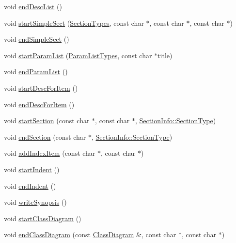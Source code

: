 \begin{DoxyCompactItemize}
\item 
void \hyperlink{class_latex_generator_afa2168d8b4b6bb3ec79398128e5a36f6}{end\+Desc\+List} ()
\item 
void \hyperlink{class_latex_generator_a854408e8d2e2dae3a8623303efff9be2}{start\+Simple\+Sect} (\hyperlink{class_base_output_doc_interface_a07a3d5df76a714674e070e5e236fe886}{Section\+Types}, const char $\ast$, const char $\ast$, const char $\ast$)
\item 
void \hyperlink{class_latex_generator_a77de974324f4e432fdc7511a35420a01}{end\+Simple\+Sect} ()
\item 
void \hyperlink{class_latex_generator_a2ee56b14fecf40c894b24bab806fb6b1}{start\+Param\+List} (\hyperlink{class_base_output_doc_interface_a944ed4d9fb389999c2724eeb321b8c8c}{Param\+List\+Types}, const char $\ast$title)
\item 
void \hyperlink{class_latex_generator_ac4add448cd45bd24b9055e59ca16c0e1}{end\+Param\+List} ()
\item 
void \hyperlink{class_latex_generator_a423a4c8f0d6b49352edcfa7261fdb1c0}{start\+Desc\+For\+Item} ()
\item 
void \hyperlink{class_latex_generator_a435efc951be4e6d166b4658a34d8b810}{end\+Desc\+For\+Item} ()
\item 
void \hyperlink{class_latex_generator_a93e679ac80ca24f50f72fefa51e7d98e}{start\+Section} (const char $\ast$, const char $\ast$, \hyperlink{struct_section_info_a32308f52dd59422b14fb75a92c90ebf1}{Section\+Info\+::\+Section\+Type})
\item 
void \hyperlink{class_latex_generator_aec87e4e5a2e5f72924316fb20005903b}{end\+Section} (const char $\ast$, \hyperlink{struct_section_info_a32308f52dd59422b14fb75a92c90ebf1}{Section\+Info\+::\+Section\+Type})
\item 
void \hyperlink{class_latex_generator_aabbdce121f41f32494aa03a28863840d}{add\+Index\+Item} (const char $\ast$, const char $\ast$)
\item 
void \hyperlink{class_latex_generator_a74eea0dc8113265d289a01f7f59fcf39}{start\+Indent} ()
\item 
void \hyperlink{class_latex_generator_a424ac60d3215a138bd4e50227c0e4445}{end\+Indent} ()
\item 
void \hyperlink{class_latex_generator_aa53e33f421454ff463a11eb0b0a7afc5}{write\+Synopsis} ()
\item 
void \hyperlink{class_latex_generator_aee32e115984402a2d4b49c4a7d153a53}{start\+Class\+Diagram} ()
\item 
void \hyperlink{class_latex_generator_a0225710e54247e934ce69e8d009979e3}{end\+Class\+Diagram} (const \hyperlink{class_class_diagram}{Class\+Diagram} \&, const char $\ast$, const char $\ast$)

\end{DoxyCompactItemize}
